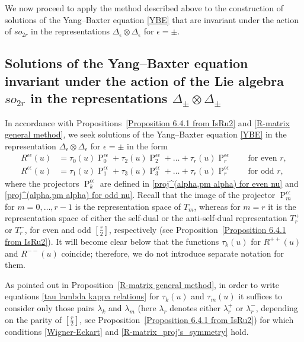 \documentclass[a4paper]{article}
\renewcommand{\=}{\ =\ }
\DeclareMathOperator{\proj}{P}
\numberwithin{equation}{section}
\theoremstyle{remark}
\begin{document}
We now proceed to apply the method described above to the construction of solutions of the Yang--Baxter equation \eqref{YBE} that are invariant under the action of $so_{2r}$ in the representations $\Delta_\epsilon\otimes \Delta_\epsilon$ for $\epsilon=\pm$.

\subsection{Solutions of the Yang--Baxter equation invariant under the action of the Lie algebra $so_{2r}$ in the representations $\Delta_\pm\otimes \Delta_\pm$}

In accordance with Propositions~\ref{Proposition 6.4.1 from IsRu2} and \ref{R-matrix general method}, we seek solutions of the Yang--Baxter equation \eqref{YBE} in the representation $\Delta_\epsilon\otimes \Delta_\epsilon$ for $\epsilon=\pm$ in the form
\begin{equation}\label{spinor R expansion}
\begin{aligned}
R^{\epsilon\epsilon}(u)&=\tau_0(u)\proj_0^{\epsilon\epsilon}+\tau_2(u)\proj_2^{\epsilon\epsilon}+\dots +\tau_r(u)\proj_r^{\epsilon\epsilon}
\qquad \text{for even }r,\\
R^{\epsilon\epsilon}(u)&=\tau_1(u)\proj_1^{\epsilon\epsilon}+\tau_3(u)\proj_3^{\epsilon\epsilon}+\dots +\tau_r(u)\proj_r^{\epsilon\epsilon}
\qquad \text{for odd }r,
\end{aligned}
\end{equation}
where the projectors $\proj^{\epsilon\epsilon}_k$ are defined in
\eqref{proj^(alpha,pm alpha) for even nu} and
\eqref{proj^(alpha,pm alpha) for odd nu}.
Recall that the image of the projector $\proj_m^{\epsilon\epsilon}$ for $m=0,\dots,r-1$ is the representation space of $T_m$, whereas for $m=r$ it is the representation space of either the self-dual or the anti-self-dual representation $T_r^{+}$ or $T_r^-$, for even and odd $[\frac{r}{2}]$, respectively (see Proposition~\ref{Proposition 6.4.1 from IsRu2}).
It will become clear below that the functions $\tau_k(u)$ for $R^{++}(u)$ and $R^{--}(u)$ coincide; therefore, we do not introduce separate notation for them.

As pointed out in Proposition~\ref{R-matrix general method}, in order to write equations \eqref{tau lambda kappa relations} for $\tau_k(u)$ and $\tau_m(u)$ it suffices to consider only those pairs $\lambda_k$ and $\lambda_m$ (here $\lambda_r$ denotes either $\lambda_r^+$ or $\lambda_r^-$, depending on the parity of $[\frac{r}{2}]$, see Proposition~\ref{Proposition 6.4.1 from IsRu2}) for which conditions \eqref{Wigner-Eckart} and \eqref{R-matrix_proj's_symmetry} hold.
\end{document}
